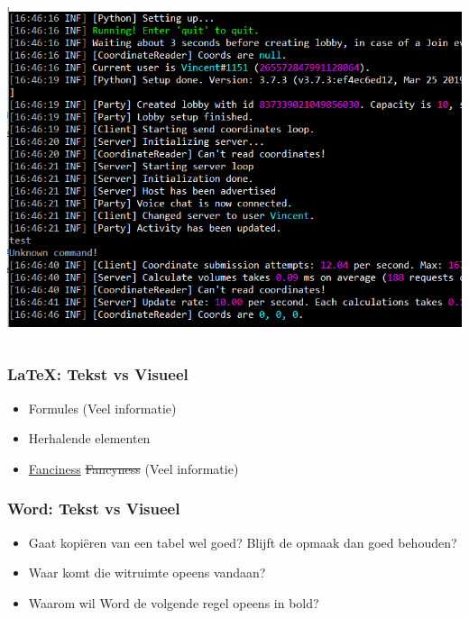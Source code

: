 \documentclass[../presentatie.tex]{subfiles}
\begin{document}
\begin{frame}
\begin{columns}
\begin{column}{0.5\textwidth}
                \medskip
                \includegraphics[trim={0px 90px 0px 5px},clip,width=\linewidth,height=0.4\textheight,keepaspectratio]{assets/consoleOutput.png}
            \end{column}
        \end{columns}
    \end{frame}

    \begin{frame}
        \frametitle{\LaTeX: Tekst vs Visueel}
        
        \begin{itemize}
            \item Formules (Veel informatie)
            \item Herhalende elementen
            \item {\ul{Fanciness}} {\setul{0pt}{1pt}\st{Fancyness}} (Veel informatie)
        \end{itemize}
    \end{frame}
    
    \begin{frame}
        \frametitle{Word: Tekst vs Visueel}
        
        \begin{itemize}
            \item Gaat kopiëren van een tabel wel goed? Blijft de opmaak dan goed behouden?
            \item Waar komt die witruimte opeens vandaan?
            \item Waarom wil Word de volgende regel opeens in bold?
        \end{itemize}
    
    \end{frame}
    
\end{document}
